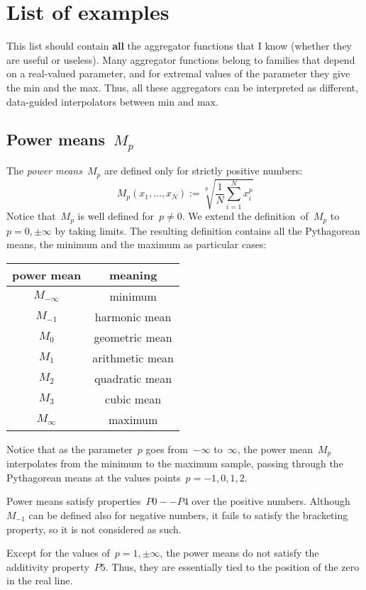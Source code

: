 \section{List of examples}

This list should contain {\bf all} the aggregator functions that I
know (whether they are useful or useless).  Many aggregator functions
belong to families that depend on a real-valued parameter, and for
extremal values of the parameter they give the min and the max.
Thus, all these aggregators can be interpreted as different,
data-guided interpolators between min and max.

\subsection{Power means~$M_p$}

The \emph{power means}~$M_p$ are defined only for strictly positive numbers:
\[
	M_p(x_1,\ldots,x_N):=\sqrt[p]{\frac{1}{N}\sum_{i=1}^Nx_i^p}
\]
Notice that~$M_p$ is well defined for~$p\neq0$.  We extend the
definition~of~$M_p$ to~$p=0,\pm\infty$ by taking limits.  The
resulting definition contains all the Pythagorean means, the minimum and
the maximum as particular cases:

\medskip

\begin{tabular}{c|c}
	power mean & meaning \\
	\hline
	$M_{-\infty}$ & minimum \\
	$M_{-1}$ & harmonic mean \\
	$M_0$ & geometric mean \\
	$M_1$ & arithmetic mean \\
	$M_2$ & quadratic mean \\
	$M_3$ & cubic mean \\
	$M_\infty$ & maximum \\
\end{tabular}

\medskip

Notice that as the parameter~$p$ goes from~$-\infty$ to~$\infty$, the
power mean~$M_p$ interpolates from the minimum to the maximum sample,
passing through the Pythagorean means at the values
points~$p=-1,0,1,2$.

Power means satisfy properties~$P0--P4$ over the positive numbers.
Although~$M_{-1}$ can be defined also for negative numbers, it fails
to satisfy the bracketing property, so it is not considered as such.

Except for the values of~$p=1,\pm\infty$, the power means do not
satisfy the additivity property~$P5$.  Thus, they are essentially
tied to the position of the zero in the real line.

